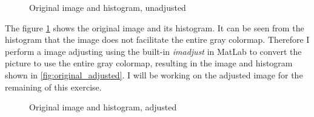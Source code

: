 \documentclass[a4paper, 10pt, final]{article}
\begin{document}
\begin{figure}[!h]
\centering
{}
\caption{Original image and histogram, unadjusted}
\label{fig:original}
\end{figure}
The figure \ref{fig:original} shows the original image and its histogram. It can be seen from the histogram that the image does not facilitate the entire gray colormap. Therefore I perform a image adjusting using the built-in \emph{imadjust} in MatLab to convert the picture to use the entire gray colormap, resulting in the image and histogram shown in \ref{fig:original_adjusted}. I will be working on the adjusted image for the remaining of this exercise. 

\begin{figure}[!h]
\centering
{}
\caption{Original image and histogram, adjusted}
\label{fig:original_adjust}
\end{figure}
\end{document}
